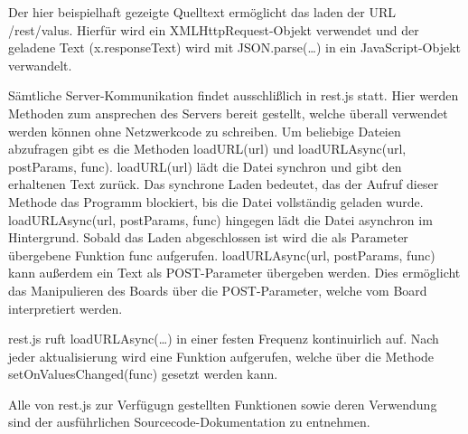 Der hier beispielhaft gezeigte Quelltext ermöglicht das laden der URL
\textrm{/rest/valus}.
Hierfür wird ein XMLHttpRequest-Objekt verwendet und der geladene Text
(\textrm{x.responseText}) wird mit \textrm{JSON.parse(\ldots)} in ein
JavaScript-Objekt verwandelt.

Sämtliche Server-Kommunikation findet ausschlißlich in \textrm{rest.js} statt.
Hier werden Methoden zum ansprechen des Servers bereit gestellt, welche überall
verwendet werden können ohne Netzwerkcode zu schreiben. Um beliebige Dateien
abzufragen gibt es die Methoden \textrm{loadURL(url)} und
\textrm{loadURLAsync(url, postParams, func)}. \textrm{loadURL(url)} lädt die
Datei synchron und gibt den erhaltenen Text zurück. Das synchrone Laden
bedeutet, das der Aufruf dieser Methode das Programm blockiert, bis die Datei
vollständig geladen wurde. \textrm{loadURLAsync(url, postParams, func)} hingegen
lädt die Datei asynchron im Hintergrund. Sobald das Laden abgeschlossen ist wird
die als Parameter übergebene Funktion \textrm{func} aufgerufen.
\textrm{loadURLAsync(url, postParams, func)} kann außerdem ein Text als
POST-Parameter übergeben werden. Dies ermöglicht das Manipulieren des Boards
über die POST-Parameter, welche vom Board interpretiert werden.

\textrm{rest.js} ruft \textrm{loadURLAsync(\ldots)} in einer festen Frequenz
kontinuirlich auf. Nach jeder aktualisierung wird eine Funktion aufgerufen,
welche über die Methode \textrm{setOnValuesChanged(func)} gesetzt werden kann.

Alle von \textrm{rest.js} zur Verfügugn gestellten Funktionen sowie deren
Verwendung sind der ausführlichen Sourcecode-Dokumentation zu entnehmen.

